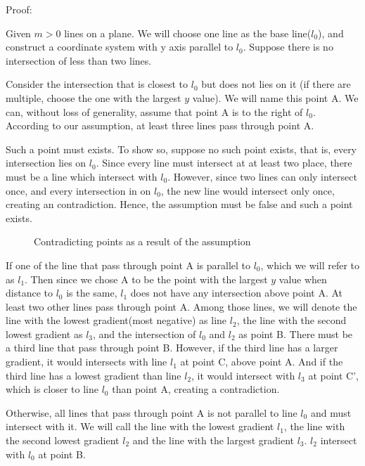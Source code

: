 \documentclass[a4paper, 12pt]{article}
\begin{document}
Proof:

Given $m>0$ lines on a plane. We will choose one line as the base line($l_0$), and construct a coordinate system with y axis parallel to $l_0$. Suppose there is no intersection of less than two lines. 

Consider the intersection that is closest to $l_0$ but does not lies on it (if there are multiple, choose the one with the largest $y$ value). We will name this point A. We can, without loss of generality, assume that point A is to the right of $l_0$. According to our assumption, at least three lines pass through point A.

Such a point must exists. To show so, suppose no such point exists, that is, every intersection lies on $l_0$. Since every line must intersect at at least two place, there must be a line which intersect with $l_0$. However, since two lines can only intersect once, and every intersection in on $l_0$, the new line would intersect only once, creating an contradiction. Hence, the assumption must be false and such a point exists.

\begin{wrapfigure}{r}{0.25\textwidth}
    
    \caption{Contradicting points as a result of the assumption}
    \label{fig:triple_intersect_para_1}
\end{wrapfigure}
If one of the line that pass through point A is parallel to $l_0$, which we will refer to as $l_1$. Then since we chose A to be the point with the largest $y$ value when distance to $l_0$ is the same, $l_1$ does not have any intersection above point A. At least two other lines pass through point A. Among those lines, we will denote the line with the lowest gradient(most negative) as line $l_2$, the line with the second lowest gradient as $l_3$, and the intersection of $l_0$ and $l_2$ as point B. There must be a third line that pass through point B. However, if the third line has a larger gradient, it would intersects with line $l_1$ at point C, above point A. And if the third line has a lowest gradient than line $l_2$, it would intersect with $l_3$ at point C', which is closer to line $l_0$ than point A, creating a contradiction.

Otherwise, all lines that pass through point A is not parallel to line $l_0$ and must intersect with it. We will call the line with the lowest gradient $l_1$, the line with the second lowest gradient $l_2$ and the line with the largest gradient $l_3$. $l_2$ intersect with $l_0$ at point B.
\end{document}

